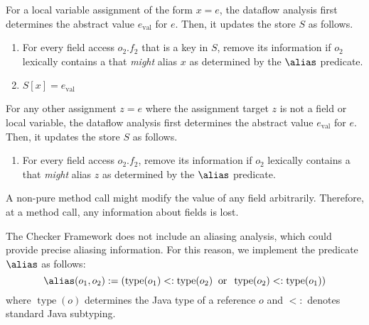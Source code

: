 
For a local variable assignment of the form $x = e$,
the dataflow analysis first determines the abstract value $e_\text{val}$ for
$e$.
Then, it updates the store $S$ as follows.
\begin{enumerate}
    \item For every field access $o_2.f_2$ that is a key in $S$,
      remove its information if $o_2$ lexically contains a
       that \emph{might} alias $x$ as determined
      by the $\alias$ predicate.
    \item $S[x] = e_\text{val}$
\end{enumerate}


For any other assignment $z = e$ where the
assignment target $z$ is not a field or local variable,
the dataflow analysis first determines the abstract value $e_\text{val}$ for
$e$.
Then, it updates the store $S$ as follows.
\begin{enumerate}
    \item For every field access $o_2.f_2$, remove its information if
    $o_2$ lexically contains a  that \emph{might}
    alias $z$ as determined by the $\alias$ predicate.
\end{enumerate}



A non-pure method call might modify the value of any field arbitrarily.
Therefore, at a method call, any information about fields is lost.


\label{sec:alias}

The Checker Framework does not include an aliasing analysis, which could
provide precise aliasing information.  For this reason, we implement the
predicate $\alias$ as follows:
\[ \alias(o_1,o_2) :=
\left(\operatorname{type}(o_1) <: \operatorname{type}(o_2)
\;\;\text{or}\;\;
\operatorname{type}(o_2) <: \operatorname{type}(o_1) \right) \]
where $\operatorname{type}(o)$ determines the Java type of a reference $o$
and $<:$ denotes standard Java subtyping.



